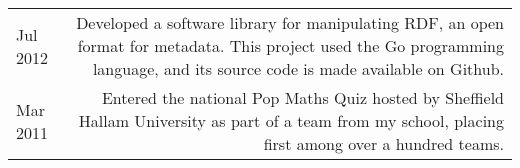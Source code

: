 \begin{longtable}{L!{\sep}R}
    Jul 2012 &
    Developed a software library for manipulating RDF, an open format for metadata. This project used the Go programming language, and its source code is made available on Github.
    \vspace{1.2em} \\

    Mar 2011 &
    Entered the national Pop Maths Quiz hosted by Sheffield Hallam University as part of a team from my school, placing first among over a hundred teams.
    \\
\end{longtable}
